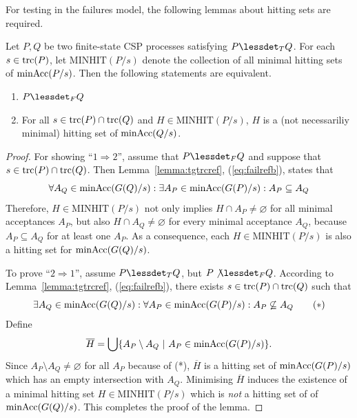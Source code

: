 For testing in the failures model, the following lemmas about hitting sets are required.

\begin{lemma}
\label{lemma:hseta}
Let $P, Q$ be two finite-state CSP processes satisfying $P\lessdet_T Q$. 
For each $s\in\text{trc}(P)$,
let $\text{MINHIT}(P/s)$ denote the
collection of all minimal hitting sets of $\text{minAcc}(P/s)$. 
Then the following statements are equivalent.
\begin{enumerate}
\item $P\lessdet_F Q$
\item For all $s\in\text{trc}(P)\cap \text{trc}(Q)$ and $H \in  \text{MINHIT}(P/s)$, $H$ is
a (not necessariliy minimal) hitting set of $\text{minAcc}(Q/s)$.
\end{enumerate}
\end{lemma}
\begin{proof}
For showing ``$1 \Rightarrow 2$'', assume that $P\lessdet_F Q$ and suppose that
$s\in\text{trc}(P)\cap \text{trc}(Q)$. Then Lemma~\ref{lemma:tgtrcref}, (\ref{eq:failrefb}), 
states that 
\[
\forall A_Q\in\text{minAcc}(G(Q)/s):
\exists A_P\in\text{minAcc}(G(P)/s): A_P\subseteq A_Q
\]
Therefore,
$H \in  \text{MINHIT}(P/s)$ not only implies $H\cap A_P\neq\varnothing$ for all minimal
acceptances $A_P$, but also
$H\cap A_Q\neq\varnothing$ for every minimal acceptance $A_Q$, because $A_P\subseteq A_Q$ for at least one $A_P$. As a consequence, each $H \in  \text{MINHIT}(P/s)$ is also a hitting set for $\text{minAcc}(G(Q)/s)$.
 
To prove ``$2 \Rightarrow 1$'',
assume $P\lessdet_T Q$, but $P\not\lessdet_F Q$. According to Lemma~\ref{lemma:tgtrcref}, (\ref{eq:failrefb}), there exists $s\in\text{trc}(P)\cap \text{trc}(Q)$ such that 
\[
\exists A_Q\in\text{minAcc}(G(Q)/s): \forall A_P\in\text{minAcc}(G(P)/s): A_P\not\subseteq A_Q 
\qquad (*)
\]
Define 
\[
\overline H = \bigcup\{ A_P \setminus A_Q~|~A_P\in\text{minAcc}(G(P)/s) \}.
\]
Since $A_P \setminus A_Q \neq\varnothing$ for all $A_P$ because of (*), $\overline H$ is a hitting set
of $\text{minAcc}(G(P)/s)$ which has an  empty intersection with $A_Q$. Minimising 
$\overline H$ induces the existence
of a minimal hitting set $H\in \text{MINHIT}(P/s)$ which is {\it not} a hitting set of 
of $\text{minAcc}(G(Q)/s)$. This completes the proof of the lemma.
\xbox
\end{proof}

%
%







 